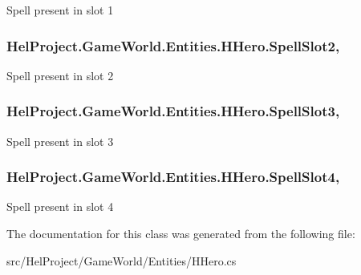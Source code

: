 Spell present in slot 1 

\hypertarget{class_hel_project_1_1_game_world_1_1_entities_1_1_h_hero_ad6d1b72488cfdcdd5a6a2a013ab3aa2e}{}
\subsubsection[{Spell\+Slot2}]{ Hel\+Project.\+Game\+World.\+Entities.\+H\+Hero.\+Spell\+Slot2\hspace{0.3cm}{\ttfamily [get]}, {\ttfamily [set]}}\label{class_hel_project_1_1_game_world_1_1_entities_1_1_h_hero_ad6d1b72488cfdcdd5a6a2a013ab3aa2e}


Spell present in slot 2 

\hypertarget{class_hel_project_1_1_game_world_1_1_entities_1_1_h_hero_a172d2aa2527d8bf89ba2ed3bbc1768ba}{}
\subsubsection[{Spell\+Slot3}]{ Hel\+Project.\+Game\+World.\+Entities.\+H\+Hero.\+Spell\+Slot3\hspace{0.3cm}{\ttfamily [get]}, {\ttfamily [set]}}\label{class_hel_project_1_1_game_world_1_1_entities_1_1_h_hero_a172d2aa2527d8bf89ba2ed3bbc1768ba}


Spell present in slot 3 

\hypertarget{class_hel_project_1_1_game_world_1_1_entities_1_1_h_hero_a20b187db40947594071dd7454380f23d}{}
\subsubsection[{Spell\+Slot4}]{ Hel\+Project.\+Game\+World.\+Entities.\+H\+Hero.\+Spell\+Slot4\hspace{0.3cm}{\ttfamily [get]}, {\ttfamily [set]}}\label{class_hel_project_1_1_game_world_1_1_entities_1_1_h_hero_a20b187db40947594071dd7454380f23d}


Spell present in slot 4 



The documentation for this class was generated from the following file\+:\begin{DoxyCompactItemize}
\item 
src/\+Hel\+Project/\+Game\+World/\+Entities/H\+Hero.\+cs\end{DoxyCompactItemize}
